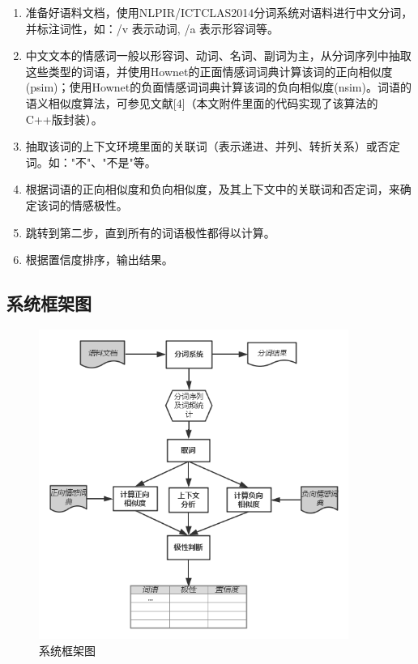 \documentclass[11pt,a4paper]{article}
\begin{document}
\begin{enumerate}
\item 准备好语料文档，使用NLPIR/ICTCLAS2014分词系统对语料进行中文分词，并标注词性，如：/v 表示动词, /a 表示形容词等。
\item 中文文本的情感词一般以形容词、动词、名词、副词为主，从分词序列中抽取这些类型的词语，并使用Hownet的正面情感词词典计算该词的正向相似度(psim)；使用Hownet的负面情感词词典计算该词的负向相似度(nsim)。词语的语义相似度算法，可参见文献[4]（本文附件里面的代码实现了该算法的C++版封装）。
\item 抽取该词的上下文环境里面的关联词（表示递进、并列、转折关系）或否定词。如："不"、"不是"等。
\item 根据词语的正向相似度和负向相似度，及其上下文中的关联词和否定词，来确定该词的情感极性。
\item 跳转到第二步，直到所有的词语极性都得以计算。
\item 根据置信度排序，输出结果。
\end{enumerate}

\subsection{系统框架图}

\begin{figure}[!hbp]
\centering
\includegraphics[width=0.9\textwidth]{sentiment.png}
\caption{系统框架图}
\end{figure}
\end{document}
